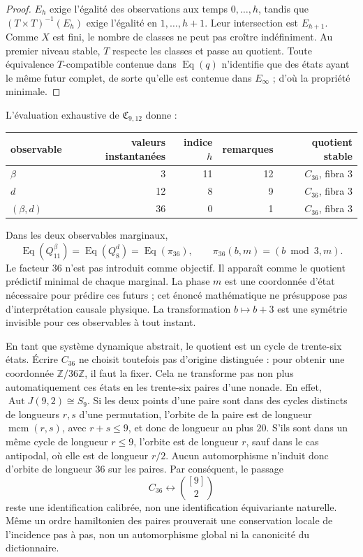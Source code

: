 \begin{proof}
\(E_h\) exige l'égalité des observations aux temps \(0,\ldots,h\), tandis que
\((T\times T)^{-1}(E_h)\) exige l'égalité en \(1,\ldots,h+1\). Leur intersection est
\(E_{h+1}\). Comme \(X\) est fini, le nombre de classes ne peut pas croître
indéfiniment. Au premier niveau stable, \(T\) respecte les classes et
passe au quotient. Toute équivalence \(T\)-compatible contenue dans
\(\operatorname{Eq}(q)\)
n'identifie que des états ayant le même futur complet, de sorte qu'elle est
contenue dans \(E_\infty\) ; d'où la propriété minimale.
\end{proof}

L'évaluation exhaustive de \(\mathfrak C_{9,12}\) donne :
\begin{center}
\small
\begin{tabular}{@{}lrrrr@{}}
\toprule
observable & valeurs instantanées & indice \(h\) & remarques & quotient stable\\
\midrule
\(\beta\) & 3 & 11 & 12 & \(C_{36}\), fibra 3\\
\(d\) & 12 & 8 & 9 & \(C_{36}\), fibra 3\\
\((\beta,d)\) & 36 & 0 & 1 & \(C_{36}\), fibra 3\\
\bottomrule
\end{tabular}
\end{center}
Dans les deux observables marginaux,
\[
\operatorname{Eq}(Q_{11}^{\beta})
=\operatorname{Eq}(Q_8^d)
=\operatorname{Eq}(\pi_{36}),
\qquad
\pi_{36}(b,m)=(b\bmod3,m).
\]
Le facteur \(36\) n'est pas introduit comme objectif. Il apparaît comme le quotient
prédictif minimal de chaque marginal. La phase \(m\) est une coordonnée d'état
nécessaire pour prédire ces futurs ; cet énoncé mathématique ne présuppose pas
d'interprétation causale physique. La transformation \(b\mapsto b+3\) est une
symétrie invisible pour ces observables à tout instant.

En tant que système dynamique abstrait, le quotient est un cycle de trente-six
états. Écrire \(C_{36}\) ne choisit toutefois pas d'origine distinguée :
pour obtenir une coordonnée \(\mathbb Z/36\mathbb Z\), il faut la fixer. Cela ne
transforme pas non plus automatiquement ces états en les trente-six paires d'une
nonade. En effet, \(\operatorname{Aut}J(9,2)\cong S_9\). Si les deux points d'une
paire sont dans des cycles distincts de longueurs \(r,s\) d'une permutation,
l'orbite de la paire est de longueur \(\operatorname{mcm}(r,s)\), avec \(r+s\leq9\),
et donc de longueur au plus \(20\). S'ils sont dans un même cycle de longueur
\(r\leq9\), l'orbite est de longueur \(r\), sauf dans le cas antipodal, où elle
est de longueur \(r/2\). Aucun automorphisme n'induit donc d'orbite de longueur
\(36\) sur les paires. Par conséquent, le passage
\[
C_{36}\longleftrightarrow \binom{[9]}2
\]
reste une identification calibrée, non une identification équivariante naturelle.
Même un ordre hamiltonien des paires prouverait une conservation locale
de l'incidence pas à pas, non un automorphisme global ni la canonicité du
dictionnaire.

